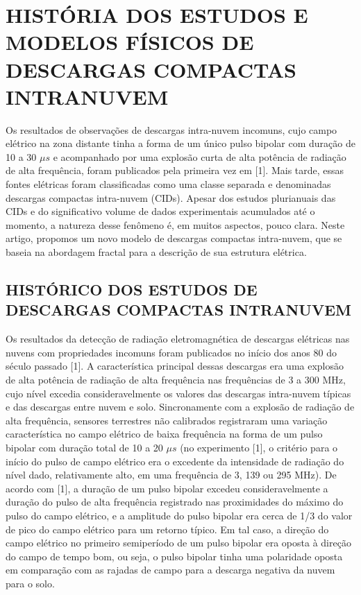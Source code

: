 \documentclass[a4paper, 12pt, onecolumn,singlespacing]{article}
\begin{document}
	\section{HISTÓRIA DOS ESTUDOS E MODELOS FÍSICOS DE DESCARGAS COMPACTAS INTRANUVEM}
	
	Os resultados de observações de descargas intra-nuvem incomuns, cujo campo elétrico na zona distante tinha a forma de um único pulso bipolar com duração de 10 a 30 $\mu s$ e acompanhado por uma explosão curta de alta potência de radiação de alta frequência, foram publicados pela primeira vez em [1]. Mais tarde, essas fontes elétricas foram classificadas como uma classe separada e denominadas descargas compactas intra-nuvem (CIDs). Apesar dos estudos plurianuais das CIDs e do significativo volume de dados experimentais acumulados até o momento, a natureza desse fenômeno é, em muitos aspectos, pouco clara. Neste artigo, propomos um novo modelo de descargas compactas intra-nuvem, que se baseia na abordagem fractal para a descrição de sua estrutura elétrica.
	
	\subsection{HISTÓRICO DOS ESTUDOS DE DESCARGAS COMPACTAS INTRANUVEM}
	
	Os resultados da detecção de radiação eletromagnética de descargas elétricas nas nuvens com propriedades incomuns foram publicados no início dos anos 80 do século passado [1]. A característica principal dessas descargas era uma explosão de alta potência de radiação de alta frequência nas frequências de 3 a 300 MHz, cujo nível excedia consideravelmente os valores das descargas intra-nuvem típicas e das descargas entre nuvem e solo. Sincronamente com a explosão de radiação de alta frequência, sensores terrestres não calibrados registraram uma variação característica no campo elétrico de baixa frequência na forma de um pulso bipolar com duração total de 10 a 20 $\mu s$ (no experimento [1], o critério para o início do pulso de campo elétrico era o excedente da intensidade de radiação do nível dado, relativamente alto, em uma frequência de 3, 139 ou 295 MHz). De acordo com [1], a duração de um pulso bipolar excedeu consideravelmente a duração do pulso de alta frequência registrado nas proximidades do máximo do pulso do campo elétrico, e a amplitude do pulso bipolar era cerca de 1/3 do valor de pico do campo elétrico para um retorno típico. Em tal caso, a direção do campo elétrico no primeiro semiperíodo de um pulso bipolar era oposta à direção do campo de tempo bom, ou seja, o pulso bipolar tinha uma polaridade oposta em comparação com as rajadas de campo para a descarga negativa da nuvem para o solo.
	
\end{document}
